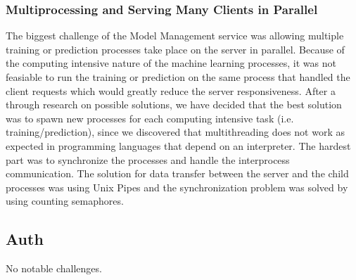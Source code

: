 \subsubsection{Multiprocessing and Serving Many Clients in Parallel}
The biggest challenge of the Model Management service was allowing multiple
training or prediction processes take place on the server in parallel. Because
of the computing intensive nature of the machine learning processes, it was
not feasiable to run the training or prediction on the same process that handled
the client requests which would greatly reduce the server responsiveness.
After a through research on possible solutions, we have decided that the 
best solution was to spawn new processes for each computing intensive task (i.e.
training/prediction), since we discovered that multithreading does not work as
expected in programming languages that depend on an interpreter. The hardest part
was to synchronize the processes and handle the interprocess communication. The solution for data transfer between
the server and the child processes was using Unix Pipes and the synchronization
problem was solved by using counting semaphores.
\subsection{Auth}
No notable challenges.